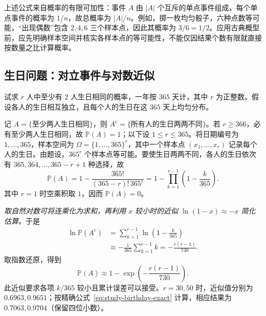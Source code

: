 \documentclass[UTF8,12pt,a4paper,fontset=fandol]{ctexbook}
\begin{document}
上述公式来自概率的有限可加性：事件 $A$ 由 $|A|$ 个互斥的单点事件组成，每个单点事件的概率为 $1/n$，故总概率为 $|A|/n$。例如，掷一枚均匀骰子，六种点数等可能，“出现偶数”包含 $2,4,6$ 三个样本点，因此其概率为 $3/6=1/2$。应用古典概型前，应先明确样本空间并核实各样本点的等可能性，不能仅因结果个数有限就直接按数量之比计算概率。

\subsection{生日问题：对立事件与对数近似}
\label{subsec:study-birthday-problem}

\begin{example}
\label{ex:study-birthday}
试求 $r$ 人中至少有 $2$ 人生日相同的概率，一年按 $365$ 天计，其中 $r$ 为正整数。假设各人的生日相互独立，且每个人的生日在这 $365$ 天上均匀分布。
\end{example}

\begin{solve}
记 $A=\{\text{至少两人生日相同}\}$，则 $A^{\mathrm c}=\{\text{所有人的生日两两不同}\}$。若 $r\ge366$，必有至少两人生日相同，故 $\mathbb P(A)=1$；以下设 $1\le r\le365$。将日期编号为 $1,\ldots,365$，样本空间为 $\Omega=\{1,\ldots,365\}^{r}$，其中一个样本点 $(x_1,\ldots,x_r)$ 记录每个人的生日。由题设，$365^r$ 个样本点等可能。要使生日两两不同，各人的生日依次有 $365,364,\ldots,365-r+1$ 种选择，故
\begin{equation}
  \mathbb P(A)=1-\frac{365!}{(365-r)!\,365^r}
  =1-\prod_{k=1}^{r-1}\left(1-\frac{k}{365}\right).
  \label{eq:study-birthday-exact}
\end{equation}
其中 $r=1$ 时空乘积取 $1$，因而 $\mathbb P(A)=0$。

\emph{取自然对数可将连乘化为求和，再利用 $x$ 较小时的近似 $\ln(1-x)\approx-x$ 简化估算。}于是
\begin{equation}
  \begin{aligned}
    \ln\mathbb P(A^{\mathrm c})
      &=\sum_{k=1}^{r-1}\ln\left(1-\frac{k}{365}\right)\\
      &\approx-\frac1{365}\sum_{k=1}^{r-1}k
      =-\frac{r(r-1)}{730}.
  \end{aligned}
  \label{eq:study-birthday-log}
\end{equation}
取指数还原，得到
\begin{equation}
  \mathbb P(A)\approx1-\exp\left(-\frac{r(r-1)}{730}\right).
  \label{eq:study-birthday-approx}
\end{equation}
此近似要求各项 $k/365$ 较小且累计误差可以接受。$r=30,50$ 时，近似值分别为 $0.6963,0.9651$；按精确公式~\eqref{eq:study-birthday-exact} 计算，相应结果为 $0.7063,0.9704$（保留四位小数）。
\end{solve}
\end{document}
